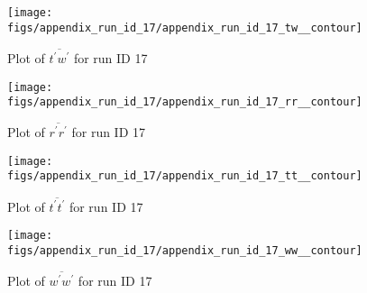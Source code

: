 \begin{figure}[H]
\centering
\texttt{[image: figs/appendix\_run\_id\_17/appendix\_run\_id\_17\_tw\_\_contour]}
\caption{Plot of $\overline{t^\prime w^\prime}$ for run ID 17}
\label{fig:appendix_run_id_17_tw__contour}
\end{figure}


\begin{figure}[H]
\centering
\texttt{[image: figs/appendix\_run\_id\_17/appendix\_run\_id\_17\_rr\_\_contour]}
\caption{Plot of $\overline{r^\prime r^\prime}$ for run ID 17}
\label{fig:appendix_run_id_17_rr__contour}
\end{figure}


\begin{figure}[H]
\centering
\texttt{[image: figs/appendix\_run\_id\_17/appendix\_run\_id\_17\_tt\_\_contour]}
\caption{Plot of $\overline{t^\prime t^\prime}$ for run ID 17}
\label{fig:appendix_run_id_17_tt__contour}
\end{figure}


\begin{figure}[H]
\centering
\texttt{[image: figs/appendix\_run\_id\_17/appendix\_run\_id\_17\_ww\_\_contour]}
\caption{Plot of $\overline{w^\prime w^\prime}$ for run ID 17}
\label{fig:appendix_run_id_17_ww__contour}
\end{figure}



